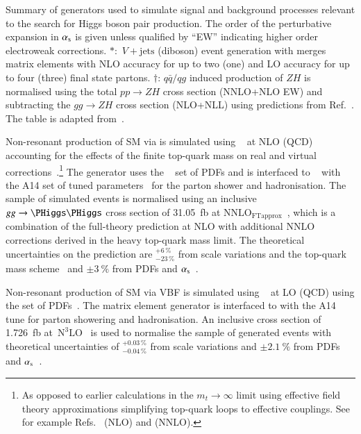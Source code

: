 \begin{sidewaystable}[p]
  \centering

  \caption{Summary of generators used to simulate signal and
    background processes relevant to the search for Higgs boson pair
    production. The order of the perturbative expansion in $\alpha_{\text{s}}$
    is given unless qualified by ``EW'' indicating higher order
    electroweak corrections. $*$:~$V+\text{jets}$ (diboson) event
    generation with \SHERPA[2.2.1] merges matrix elements with NLO
    accuracy for up to two (one) and LO accuracy for up to four
    (three) final state partons. $\dagger$: $q\bar{q} / qg$ induced
    production of $ZH$ is normalised using the total $pp \to ZH$ cross
    section (NNLO+NLO EW) and subtracting the $gg \to ZH$ cross
    section (NLO+NLL) using predictions from
    Ref.~\cite{deFlorian:2016spz}. The table is adapted
    from~\cite{ATLAS-CONF-2021-030}.}%
  \label{tab:monte_carlo}

  \resizebox{\textwidth}{!}{}
\end{sidewaystable}

Non-resonant production of SM \HH via \ggF is simulated using
\POWHEGBOX[v2]~\cite{Nason:2004rx,Frixione:2007vw,Alioli:2010xd} at
NLO (QCD) accounting for the effects of the finite top-quark mass on
real and virtual
corrections~\cite{Borowka:2016ehy,Baglio:2018lrj,Heinrich:2017kxx}.\footnote{As
  opposed to earlier calculations in the $m_{t} \to \infty$ limit
  using effective field theory approximations simplifying top-quark
  loops to effective couplings. See for example
  Refs.~\cite{Dawson:1998py} (NLO) and \cite{deFlorian:2013jea}
  (NNLO).} The generator uses the
\PDFforLHC[15nlo]~\cite{Butterworth:2015oua} set of PDFs and is
interfaced to \PYTHIA[8]~\cite{Sjostrand:2014zea} with the A14 set of
tuned parameters~\cite{ATL-PHYS-PUB-2014-021} for the parton shower
and hadronisation. The sample of simulated events is normalised using
an inclusive $gg \to \HH$ cross section of \SI{31.05}{\femto\barn} at
$\text{NNLO}_{\text{FTapprox}}$~\cite{Grazzini:2018bsd}, which is a
combination of the full-theory prediction at NLO with additional NNLO
corrections derived in the heavy top-quark mass limit. The theoretical
uncertainties on the prediction are $^{+6\,\%}_{-23\,\%}$ from scale
variations and the top-quark mass scheme~\cite{Baglio:2020wgt} and
$\pm\SI{3}{\percent}$ from PDFs and $\alpha_{\text{s}}$~\cite{LHCHWGHH}.

Non-resonant production of SM \HH via VBF is simulated using
\MGNLO~\cite{Alwall:2014hca} %
at LO (QCD) %
using the \NNPDF[3.0nlo] set of PDFs~\cite{Ball:2014uwa}. The matrix
element generator is interfaced to \PYTHIA[8] with the A14 tune for
parton showering and hadronisation. An inclusive cross section of
\SI{1.726}{\femto\barn}
at~$\text{N}^3\text{LO}$~\cite{Dreyer:2018qbw,LHCHWGHH} is used to
normalise the sample of generated events with theoretical
uncertainties of $^{+0.03\,\%}_{-0.04\,\%}$ from scale variations and
$\pm\SI{2.1}{\percent}$ from PDFs and $\alpha_{\text{s}}$~\cite{LHCHWGHH}.

